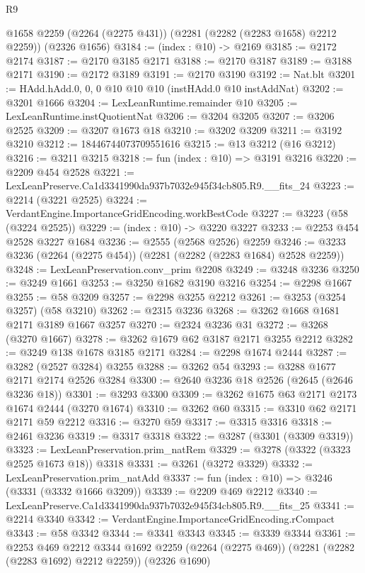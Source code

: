 \begin{lexlean}{R9}
\begin{coremodule}
    @1658
    @2259
    (@2264 (@2275 @431))
    (@2281 (@2282 (@2283 @1658) @2212 @2259))
    (@2326 @1656)
@3184 := (index : @10) -> @2169
@3185 := @2172 @2174
@3187 := @2170 @3185 @2171
@3188 := @2170 @3187
@3189 := @3188 @2171
@3190 := @2172 @3189
@3191 := @2170 @3190
@3192 := Nat.blt
@3201 := HAdd.hAdd.{0, 0, 0} @10 @10 @10 (instHAdd.{0} @10 instAddNat)
@3202 := @3201 @1666
@3204 := LexLeanRuntime.remainder @10
@3205 := LexLeanRuntime.instQuotientNat
@3206 := @3204 @3205
@3207 := @3206 @2525
@3209 := @3207 @1673 @18
@3210 := @3202 @3209
@3211 := @3192 @3210
@3212 := 18446744073709551616
@3215 := @13 @3212 (@16 @3212)
@3216 := @3211 @3215
@3218 := fun (index : @10) => @3191 @3216
@3220 := @2209 @454 @2528
@3221 := LexLeanPreserve.Ca1d3341990da937b7032e945f34cb805.R9.__fits_24
@3223 := @2214 (@3221 @2525)
@3224 := VerdantEngine.ImportanceGridEncoding.workBestCode
@3227 := @3223 (@58 (@3224 @2525))
@3229 := (index : @10) -> @3220 @3227
@3233 := @2253 @454 @2528 @3227 @1684
@3236 := @2555 (@2568 @2526) @2259
@3246 := @3233 @3236 (@2264 (@2275 @454)) (@2281 (@2282 (@2283 @1684) @2528 @2259))
@3248 := LexLeanPreservation.conv_prim @2208
@3249 := @3248 @3236
@3250 := @3249 @1661
@3253 := @3250 @1682 @3190 @3216
@3254 := @2298 @1667
@3255 := @58 @3209
@3257 := @2298 @3255 @2212
@3261 := @3253 (@3254 @3257) (@58 @3210)
@3262 := @2315 @3236
@3268 := @3262 @1668 @1681 @2171 @3189 @1667 @3257
@3270 := @2324 @3236 @31
@3272 := @3268 (@3270 @1667)
@3278 := @3262 @1679 @62 @3187 @2171 @3255 @2212
@3282 := @3249 @138 @1678 @3185 @2171
@3284 := @2298 @1674 @2444
@3287 := @3282 (@2527 @3284) @3255
@3288 := @3262 @54
@3293 := @3288 @1677 @2171 @2174 @2526 @3284
@3300 := @2640 @3236 @18 @2526 (@2645 (@2646 @3236 @18))
@3301 := @3293 @3300
@3309 := @3262 @1675 @63 @2171 @2173 @1674 @2444 (@3270 @1674)
@3310 := @3262 @60
@3315 := @3310 @62 @2171 @2171 @59 @2212
@3316 := @3270 @59
@3317 := @3315 @3316
@3318 := @2461 @3236
@3319 := @3317 @3318
@3322 := @3287 (@3301 (@3309 @3319))
@3323 := LexLeanPreservation.prim_natRem
@3329 := @3278 (@3322 (@3323 @2525 @1673 @18)) @3318
@3331 := @3261 (@3272 @3329)
@3332 := LexLeanPreservation.prim_natAdd
@3337 := fun (index : @10) => @3246 (@3331 (@3332 @1666 @3209))
@3339 := @2209 @469 @2212
@3340 := LexLeanPreserve.Ca1d3341990da937b7032e945f34cb805.R9.__fits_25
@3341 := @2214 @3340
@3342 := VerdantEngine.ImportanceGridEncoding.rCompact
@3343 := @58 @3342
@3344 := @3341 @3343
@3345 := @3339 @3344
@3361 := @2253
    @469
    @2212
    @3344
    @1692
    @2259
    (@2264 (@2275 @469))
    (@2281 (@2282 (@2283 @1692) @2212 @2259))
    (@2326 @1690)

\end{coremodule}
\end{lexlean}
